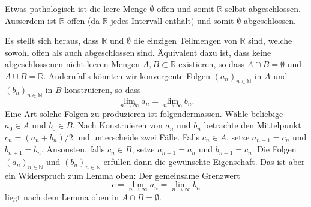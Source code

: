 \documentclass[../main.tex]{subfiles}
\begin{document}
\begin{remark}
  Etwas pathologisch ist die leere Menge $\emptyset$
  offen und somit $\mathbb{R}$ selbst abgeschlossen.
  Ausserdem ist $\mathbb{R}$ offen (da $\mathbb{R}$
  jedes Intervall enthält) und somit $\emptyset$ 
  abgeschlossen.

  Es stellt sich heraus, dass $\mathbb{R}$ und $\emptyset$ 
  die einzigen Teilmengen von $\mathbb{R}$ sind, welche
  sowohl offen als auch abgeschlossen sind.
  Äquivalent dazu ist, dass keine abgeschlossenen
  nicht-leeren Mengen $A, B \subset \mathbb{R}$ existieren,
  so dass $A \cap B = \emptyset$ und
  $A \cup B = \mathbb{R}$.
  Andernfalls könnten wir konvergente Folgen
  ${(a_{n})}_{n \in \mathbb{N}}$ in $A$
  und ${(b_{n})}_{n \in \mathbb{N}}$ in $B$ 
  konstruieren, so dass
  \[
    \lim_{n \to \infty} a_n = \lim_{n \to \infty} b_n.
  \]
  Eine Art solche Folgen zu produzieren ist folgendermassen.
  Wähle beliebige $a_0 \in A$ und $b_0 \in B$.
  Nach Konstruieren von $a_n$ und $b_n$ betrachte
  den Mittelpunkt $c_n = (a_n + b_n)/2$ und unterscheide
  zwei Fälle. Falls $c_n \in A$, setze $a_{n+1} = c_n$ 
  und $b_{n+1} = b_n$. Ansonsten, falls $c_n \in B$, setze
  $a_{n+1} = a_n$ und $b_{n+1} = c_n$.
  Die Folgen ${(a_{n})}_{n \in \mathbb{N}}$ und
  ${(b_{n})}_{n \in \mathbb{N}}$ erfüllen dann
  die gewünschte Eigenschaft. Das ist aber ein
  Widerspruch zum Lemma oben: Der gemeinsame Grenzwert
  \[
    c = \lim_{n \to \infty} a_n = \lim_{n \to \infty} b_n
  \]
  liegt nach dem Lemma oben in $A \cap B = \emptyset$.
\end{remark}
\end{document}
